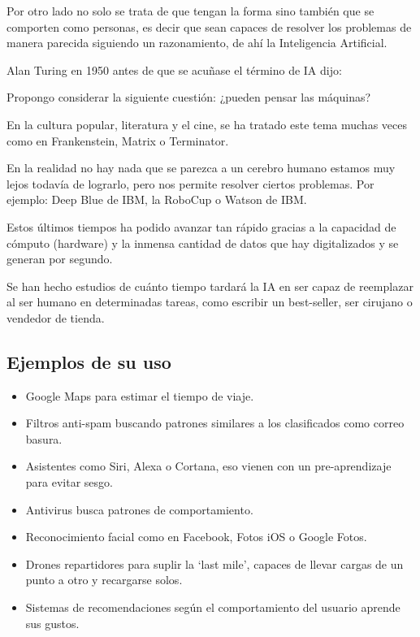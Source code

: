 \documentclass[12pt, twoside, openright]{report} %
\begin{document}
Por otro lado no solo se trata de que tengan la forma sino también que se comporten como personas, es decir que sean capaces de resolver los problemas de manera parecida siguiendo un razonamiento, de ahí la Inteligencia Artificial.

Alan Turing en 1950 antes de que se acuñase el término de IA dijo:
\begin{displayquote}
	Propongo considerar la siguiente cuestión: ¿pueden pensar las máquinas?
\end{displayquote}

En la cultura popular, literatura y el cine, se ha tratado este tema muchas veces como en Frankenstein, Matrix o Terminator.

En la realidad no hay nada que se parezca a un cerebro humano estamos muy lejos todavía de lograrlo, pero nos permite resolver ciertos problemas. Por ejemplo: Deep Blue de IBM, la RoboCup o Watson de IBM.

Estos últimos tiempos ha podido avanzar tan rápido gracias a la capacidad de cómputo (hardware) y la inmensa cantidad de datos que hay digitalizados y se generan por segundo.

Se han hecho estudios de cuánto tiempo tardará la IA en ser capaz de reemplazar al ser humano en determinadas tareas, como escribir un best-seller, ser cirujano o vendedor de tienda.

\subsection{Ejemplos de su uso}
\begin{itemize}
	\item Google Maps para estimar el tiempo de viaje.
	\item Filtros anti-spam buscando patrones similares a los clasificados como correo basura.
	\item Asistentes como Siri, Alexa o Cortana, eso vienen con un pre-aprendizaje para evitar sesgo.
	\item Antivirus busca patrones de comportamiento.
	\item Reconocimiento facial como en Facebook, Fotos iOS o Google Fotos.
	\item Drones repartidores para suplir la ‘last mile’, capaces de llevar cargas de un punto a otro y recargarse solos.
	\item Sistemas de recomendaciones según el comportamiento del usuario aprende sus gustos.
\end{itemize}
\end{document}
